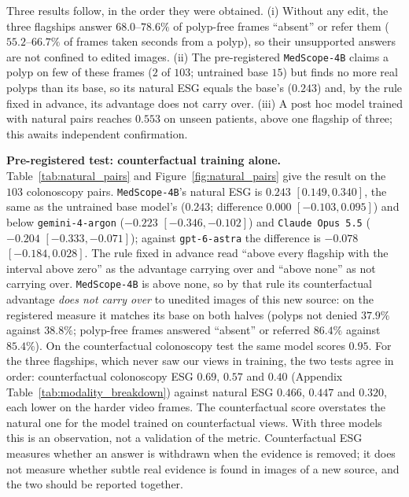 \documentclass[5p,times,twocolumn,authoryear]{elsarticle}
\begin{document}
Three results follow, in the order they were obtained. (i) Without any edit, the three flagships answer $68.0$--$78.6\%$ of polyp-free frames ``absent'' or refer them ($55.2$--$66.7\%$ of frames taken seconds from a polyp), so their unsupported answers are not confined to edited images. (ii) The pre-registered \texttt{MedScope-4B} claims a polyp on few of these frames ($2$ of $103$; untrained base $15$) but finds no more real polyps than its base, so its natural ESG equals the base's ($0.243$) and, by the rule fixed in advance, its advantage does not carry over. (iii) A post hoc model trained with natural pairs reaches $0.553$ on unseen patients, above one flagship of three; this awaits independent confirmation.

\textbf{Pre-registered test: counterfactual training alone.} Table~\ref{tab:natural_pairs} and Figure~\ref{fig:natural_pairs} give the result on the $103$ colonoscopy pairs. \texttt{MedScope-4B}'s natural ESG is $0.243$ $[0.149, 0.340]$, the same as the untrained base model's ($0.243$; difference $0.000$ $[-0.103, 0.095]$) and below \texttt{gemini-4-argon} ($-0.223$ $[-0.346, -0.102]$) and \texttt{Claude Opus 5.5} ($-0.204$ $[-0.333, -0.071]$); against \texttt{gpt-6-astra} the difference is $-0.078$ $[-0.184, 0.028]$. The rule fixed in advance read ``above every flagship with the interval above zero'' as the advantage carrying over and ``above none'' as not carrying over. \texttt{MedScope-4B} is above none, so by that rule its counterfactual advantage \emph{does not carry over} to unedited images of this new source: on the registered measure it matches its base on both halves (polyps not denied $37.9\%$ against $38.8\%$; polyp-free frames answered ``absent'' or referred $86.4\%$ against $85.4\%$). On the counterfactual colonoscopy test the same model scores $0.95$. For the three flagships, which never saw our views in training, the two tests agree in order: counterfactual colonoscopy ESG $0.69$, $0.57$ and $0.40$ (Appendix Table~\ref{tab:modality_breakdown}) against natural ESG $0.466$, $0.447$ and $0.320$, each lower on the harder video frames. The counterfactual score overstates the natural one for the model trained on counterfactual views. With three models this is an observation, not a validation of the metric. Counterfactual ESG measures whether an answer is withdrawn when the evidence is removed; it does not measure whether subtle real evidence is found in images of a new source, and the two should be reported together.
\end{document}

